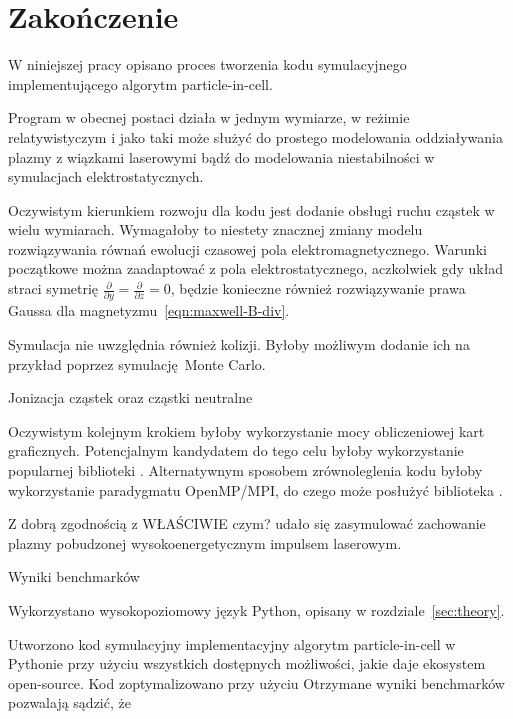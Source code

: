 \section[Zakończenie]{Zakończenie}\label{sec:ending} %

W niniejszej pracy opisano proces tworzenia kodu symulacyjnego implementującego
algorytm particle-in-cell.

Program w obecnej postaci działa w jednym wymiarze, w reżimie relatywistyczym i jako taki może służyć do prostego modelowania oddziaływania plazmy z wiązkami laserowymi
bądź do modelowania niestabilności w symulacjach elektrostatycznych.

Oczywistym kierunkiem rozwoju dla kodu jest dodanie obsługi ruchu cząstek w wielu wymiarach. Wymagałoby to niestety znacznej zmiany modelu rozwiązywania równań ewolucji czasowej pola elektromagnetycznego.
Warunki początkowe można zaadaptować z pola elektrostatycznego, aczkolwiek gdy układ straci symetrię $\frac{\partial}{\partial y} = \frac{\partial}{\partial z} = 0$, będzie konieczne również rozwiązywanie
prawa Gaussa dla magnetyzmu~\ref{eqn:maxwell-B-div}.

Symulacja nie uwzględnia również kolizji. Byłoby możliwym dodanie ich na przykład poprzez symulację Monte Carlo. %

Jonizacja cząstek oraz cząstki neutralne %

Oczywistym kolejnym krokiem byłoby wykorzystanie mocy obliczeniowej kart graficznych. Potencjalnym kandydatem do tego celu byłoby wykorzystanie popularnej biblioteki .
Alternatywnym sposobem zrównoleglenia kodu byłoby wykorzystanie paradygmatu OpenMP/MPI, do czego może posłużyć biblioteka .

Z dobrą zgodnością z WŁAŚCIWIE czym? udało się zasymulować zachowanie plazmy pobudzonej wysokoenergetycznym impulsem laserowym. %

Wyniki benchmarków %



Wykorzystano wysokopoziomowy język Python, opisany w rozdziale~\ref{sec:theory}.



Utworzono kod symulacyjny implementacyjny algorytm particle-in-cell w Pythonie przy użyciu wszystkich dostępnych
możliwości, jakie daje ekosystem open-source. Kod zoptymalizowano przy użyciu 
Otrzymane wyniki benchmarków pozwalają sądzić, że 



